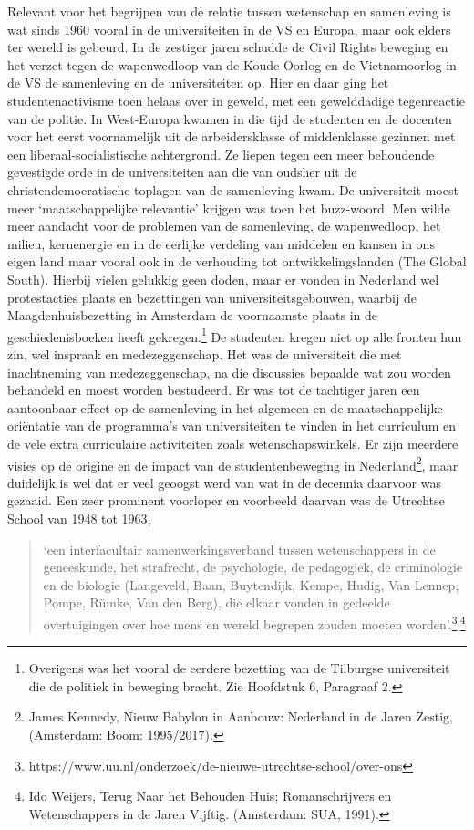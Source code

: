 \documentclass[empirical, authordate, ]{new-jote-article}
\begin{document}
	Relevant voor het begrijpen van de relatie tussen wetenschap en samenleving is wat sinds 1960 vooral in de universiteiten in de VS en Europa, maar ook elders ter wereld is gebeurd. In de zestiger jaren schudde de Civil Rights beweging en het verzet tegen de wapenwedloop van de Koude Oorlog en de Vietnamoorlog in de VS de samenleving en de universiteiten op. Hier en daar ging het studentenactivisme toen helaas over in geweld, met een gewelddadige tegenreactie van de politie. In West-Europa kwamen in die tijd de studenten en de docenten voor het eerst voornamelijk uit de arbeidersklasse of middenklasse gezinnen met een liberaal-socialistische achtergrond. Ze liepen tegen een meer behoudende gevestigde orde in de universiteiten aan die van oudsher uit de christendemocratische toplagen van de samenleving kwam. De universiteit moest meer ‘maatschappelijke relevantie' krijgen was toen het buzz-woord. Men wilde meer aandacht voor de problemen van de samenleving, de wapenwedloop, het milieu, kernenergie en in de eerlijke verdeling van middelen en kansen in ons eigen land maar vooral ook in de verhouding tot ontwikkelingslanden (The Global South). Hierbij vielen gelukkig geen doden, maar er vonden in Nederland wel protestacties plaats en bezettingen van universiteitsgebouwen, waarbij de Maagdenhuisbezetting in Amsterdam de voornaamste plaats in de geschiedenisboeken heeft gekregen.\footnote{Overigens was het vooral de eerdere bezetting van de Tilburgse universiteit die de politiek in beweging bracht. Zie Hoofdstuk 6, Paragraaf 2.} De studenten kregen niet op alle fronten hun zin, wel inspraak en medezeggenschap. Het was de universiteit die met inachtneming van medezeggenschap, na die discussies bepaalde wat zou worden behandeld en moest worden bestudeerd. Er was tot de tachtiger jaren een aantoonbaar effect op de samenleving in het algemeen en de maatschappelijke oriëntatie van de programma's van universiteiten te vinden in het curriculum en de vele extra curriculaire activiteiten zoals wetenschapswinkels. Er zijn meerdere visies op de origine en de impact van de studentenbeweging in Nederland\footnote{James Kennedy, Nieuw Babylon in Aanbouw: Nederland in de Jaren Zestig, (Amsterdam: Boom: 1995/2017).}, maar duidelijk is wel dat er veel geoogst werd van wat in de decennia daarvoor was gezaaid. Een zeer prominent voorloper en voorbeeld daarvan was de Utrechtse School van 1948 tot 1963,

	\begin{quote}
		\itshape

		‘een interfacultair samenwerkingsverband tussen wetenschappers in de geneeskunde, het strafrecht, de psychologie, de pedagogiek, de criminologie en de biologie (Langeveld, Baan, Buytendijk, Kempe, Hudig, Van Lennep, Pompe, Rümke, Van den Berg), die elkaar vonden in gedeelde overtuigingen over hoe mens en wereld begrepen zouden moeten worden'.\footnote{https://www.uu.nl/onderzoek/de-nieuwe-utrechtse-school/over-ons}\textsuperscript{,}\footnote{Ido Weijers, Terug Naar het Behouden Huis; Romanschrijvers en Wetenschappers in de Jaren Vijftig. (Amsterdam: SUA, 1991). }
	\end{quote}
\end{document}
